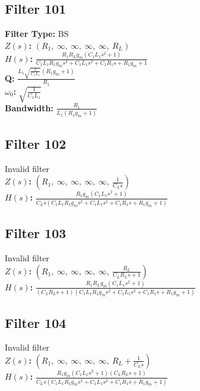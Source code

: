 \documentclass{article}
\begin{document}
\subsection*{Filter 101}
\textbf{Filter Type:} BS \\ 
\textbf{$Z(s)$:} $\left( R_{1}, \  \infty, \  \infty, \  \infty, \  \infty, \  R_{L}\right)$ \\ 
\textbf{$H(s)$:} $\frac{R_{1} R_{L} g_{m} \left(C_{1} L_{1} s^{2} + 1\right)}{C_{1} L_{1} R_{1} g_{m} s^{2} + C_{1} L_{1} s^{2} + C_{1} R_{1} s + R_{1} g_{m} + 1}$ \\ 
\textbf{Q:} $\frac{L_{1} \sqrt{\frac{1}{C_{1} L_{1}}} \left(R_{1} g_{m} + 1\right)}{R_{1}}$ \\ 
\textbf{$\omega_0$:} $\sqrt{\frac{1}{C_{1} L_{1}}}$ \\ 
\textbf{Bandwidth:} $\frac{R_{1}}{L_{1} \left(R_{1} g_{m} + 1\right)}$ \\ 
\subsection*{Filter 102}
Invalid filter \\ 
\textbf{$Z(s)$:} $\left( R_{1}, \  \infty, \  \infty, \  \infty, \  \infty, \  \frac{1}{C_{L} s}\right)$ \\ 
\textbf{$H(s)$:} $\frac{R_{1} g_{m} \left(C_{1} L_{1} s^{2} + 1\right)}{C_{L} s \left(C_{1} L_{1} R_{1} g_{m} s^{2} + C_{1} L_{1} s^{2} + C_{1} R_{1} s + R_{1} g_{m} + 1\right)}$ \\ 
\subsection*{Filter 103}
Invalid filter \\ 
\textbf{$Z(s)$:} $\left( R_{1}, \  \infty, \  \infty, \  \infty, \  \infty, \  \frac{R_{L}}{C_{L} R_{L} s + 1}\right)$ \\ 
\textbf{$H(s)$:} $\frac{R_{1} R_{L} g_{m} \left(C_{1} L_{1} s^{2} + 1\right)}{\left(C_{L} R_{L} s + 1\right) \left(C_{1} L_{1} R_{1} g_{m} s^{2} + C_{1} L_{1} s^{2} + C_{1} R_{1} s + R_{1} g_{m} + 1\right)}$ \\ 
\subsection*{Filter 104}
Invalid filter \\ 
\textbf{$Z(s)$:} $\left( R_{1}, \  \infty, \  \infty, \  \infty, \  \infty, \  R_{L} + \frac{1}{C_{L} s}\right)$ \\ 
\textbf{$H(s)$:} $\frac{R_{1} g_{m} \left(C_{1} L_{1} s^{2} + 1\right) \left(C_{L} R_{L} s + 1\right)}{C_{L} s \left(C_{1} L_{1} R_{1} g_{m} s^{2} + C_{1} L_{1} s^{2} + C_{1} R_{1} s + R_{1} g_{m} + 1\right)}$ \\ 
\end{document}
